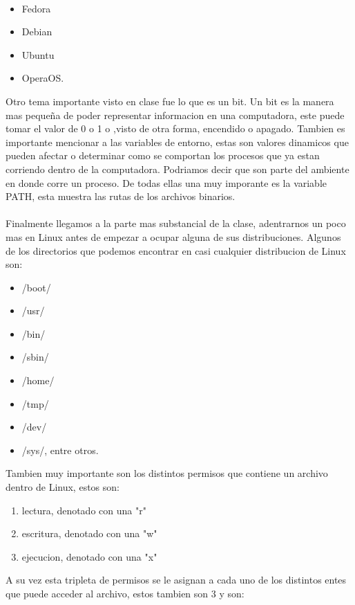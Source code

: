 \documentclass[letterpaper, 12pt, oneside]{article}
\begin{document}
	\\
	\begin{itemize}
		\item Fedora
		\item Debian
		\item Ubuntu
		\item OperaOS.
	\\
	\end{itemize}
	Otro tema importante visto en clase fue lo que es un bit. Un bit es la manera mas pequeña de poder representar informacion en una computadora, este puede tomar el valor de 0 o 1 o ,visto de otra forma, encendido o apagado. Tambien es importante mencionar a las variables de entorno, estas son valores dinamicos que pueden afectar o determinar como se comportan los procesos que ya estan corriendo dentro de la computadora. Podriamos decir que son parte del ambiente en donde corre un proceso. De todas ellas una muy imporante es la variable PATH, esta muestra las rutas de los archivos binarios. 
	\\
	\\
	Finalmente llegamos a la parte mas substancial de la clase, adentrarnos un poco mas en Linux antes de empezar a ocupar alguna de sus distribuciones. Algunos de los directorios que podemos encontrar en casi cualquier distribucion de Linux son:
	\\
	\begin{itemize}
		\item /boot/
		\item /usr/
		\item /bin/
		\item /sbin/
		\item /home/
		\item /tmp/
		\item /dev/
		\item /sys/, entre otros.
	\\
	\end{itemize}
	Tambien muy importante son los distintos permisos que contiene un archivo dentro de Linux, estos son:
	\\
	\begin{enumerate}
		\item lectura, denotado con una "r"
		\item escritura, denotado con una "w"
		\item ejecucion, denotado con una "x"
	\\
	\end{enumerate}	
	A su vez esta tripleta de permisos se le asignan a cada uno de los distintos entes que puede acceder al archivo, estos tambien son 3 y son:
\end{document}

